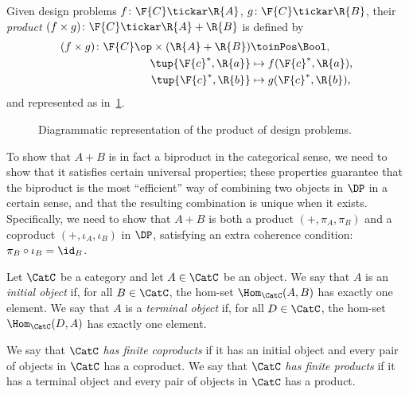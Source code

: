 \begin{definition}
\label{define:product}
Given design problems $f\colon \F{C} \tickar \R{A}$, $g \colon \F{C} \tickar \R{B}$, their \emph{product} $(f \times g)\colon \F{C} \tickar \R{A} + \R{B}$ is defined by
\begin{equation}
\begin{aligned}
    (f \times g) \colon \F{C}\op  \times (\R{A} + \R{B}) & \toinPos \Bool,  \\
            \tup{\F{c}^*, \R{a}} & \mapsto f(\F{c}^*, \R{a}), \\
            \tup{\F{c}^*, \R{b}} & \mapsto g(\F{c}^*, \R{b}),
\end{aligned}
\end{equation}
and represented as in~\cref{fig:productdp}.

\begin{figure}[h!]
\begin{center}
\end{center}
\caption{Diagrammatic representation of the product of design problems. \label{fig:productdp}}
\end{figure}

\end{definition}


To show that $A + B$ is in fact a biproduct in the categorical sense, we need to show that it satisfies certain universal properties; these properties guarantee that the biproduct is the most ``efficient'' way of combining two objects in $\DP$ in a certain sense, and that the resulting combination is unique when it exists. Specifically, we need to show that $A + B$ is both a product $(+, \pi_A, \pi_B)$ and a coproduct $(+, \iota_A, \iota_B)$ in $\DP$, satisfying an extra coherence condition: $\pi_B \circ \iota_B = \id_B$.

\begin{shaded}
\begin{definition}
Let $\CatC$ be a category and let $A \in \CatC$ be an object. We say that $A$ is an \emph{initial object} if, for all $B \in\CatC$, the hom-set $\Hom_\CatC(A,B)$ has exactly one element. We say that $A$ is a \emph{terminal object} if, for all $D\in\CatC$, the hom-set $\Hom_\CatC(D,A)$ has exactly one element.
\end{definition}

\begin{definition}
We say that $\CatC$ \emph{has finite coproducts} if it has an initial object and every pair of objects in $\CatC$ has a coproduct.
We say that $\CatC$ \emph{has finite products} if it has a terminal object and every pair of objects in $\CatC$ has a product.
\end{definition}
\end{shaded}

